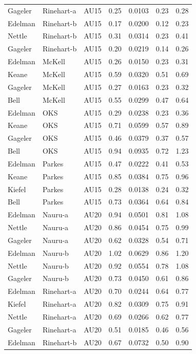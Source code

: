 \documentclass{monashthesis}
\begin{document}
\begin{center}
\begin{longtable}{lllllll}
Gageler & Rinehart-a & AU15 & 0.25 & 0.0103 & 0.23 & 0.28 \\
Edelman & Rinehart-b & AU15 & 0.17 & 0.0200 & 0.12 & 0.23 \\
Nettle & Rinehart-b & AU15 & 0.31 & 0.0314 & 0.23 & 0.41 \\
Gageler & Rinehart-b & AU15 & 0.20 & 0.0219 & 0.14 & 0.26 \\
Edelman & McKell & AU15 & 0.26 & 0.0150 & 0.23 & 0.31 \\
Keane & McKell & AU15 & 0.59 & 0.0320 & 0.51 & 0.69 \\
Gageler & McKell & AU15 & 0.27 & 0.0163 & 0.23 & 0.32 \\
Bell & McKell & AU15 & 0.55 & 0.0299 & 0.47 & 0.64 \\
Edelman & OKS & AU15 & 0.29 & 0.0238 & 0.23 & 0.36 \\
Keane & OKS & AU15 & 0.71 & 0.0599 & 0.57 & 0.89 \\
Gageler & OKS & AU15 & 0.46 & 0.0379 & 0.37 & 0.57 \\
Bell & OKS & AU15 & 0.94 & 0.0935 & 0.72 & 1.23 \\
Edelman & Parkes & AU15 & 0.47 & 0.0222 & 0.41 & 0.53 \\
Keane & Parkes & AU15 & 0.85 & 0.0384 & 0.75 & 0.96 \\
Kiefel & Parkes & AU15 & 0.28 & 0.0138 & 0.24 & 0.32 \\
Bell & Parkes & AU15 & 0.73 & 0.0364 & 0.64 & 0.84 \\
Edelman & Nauru-a & AU20 & 0.94 & 0.0501 & 0.81 & 1.08 \\
Nettle & Nauru-a & AU20 & 0.86 & 0.0454 & 0.75 & 0.99 \\
Gageler & Nauru-a & AU20 & 0.62 & 0.0328 & 0.54 & 0.71 \\
Edelman & Nauru-b & AU20 & 1.02 & 0.0629 & 0.86 & 1.20 \\
Nettle & Nauru-b & AU20 & 0.92 & 0.0554 & 0.78 & 1.08 \\
Gageler & Nauru-b & AU20 & 0.73 & 0.0450 & 0.61 & 0.86 \\
Edelman & Rinehart-a & AU20 & 0.70 & 0.0244 & 0.64 & 0.77 \\
Kiefel & Rinehart-a & AU20 & 0.82 & 0.0309 & 0.75 & 0.91 \\
Nettle & Rinehart-a & AU20 & 0.69 & 0.0266 & 0.62 & 0.77 \\
Gageler & Rinehart-a & AU20 & 0.51 & 0.0185 & 0.46 & 0.56 \\
Edelman & Rinehart-b & AU20 & 0.67 & 0.0732 & 0.50 & 0.90 \\

\end{longtable}
\end{center}
\end{document}
